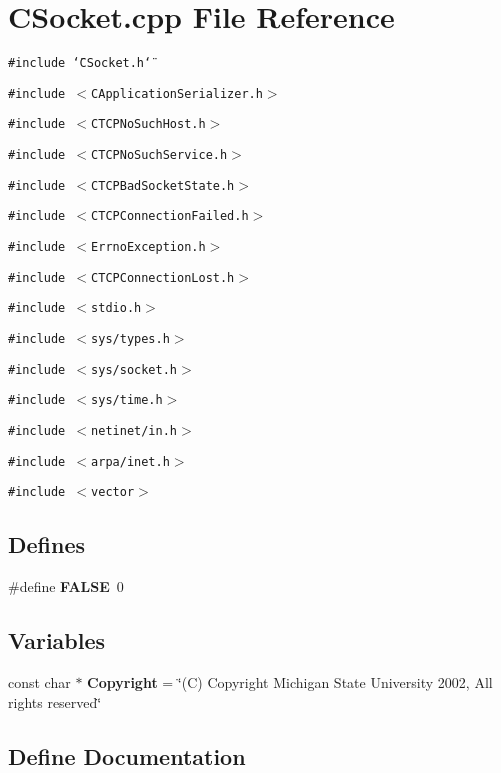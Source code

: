 \section{CSocket.cpp File Reference}
\label{CSocket_8cpp}
{\tt \#include \char`\"{}CSocket.h\char`\"{}}\par
{\tt \#include $<$CApplication\-Serializer.h$>$}\par
{\tt \#include $<$CTCPNo\-Such\-Host.h$>$}\par
{\tt \#include $<$CTCPNo\-Such\-Service.h$>$}\par
{\tt \#include $<$CTCPBad\-Socket\-State.h$>$}\par
{\tt \#include $<$CTCPConnection\-Failed.h$>$}\par
{\tt \#include $<$Errno\-Exception.h$>$}\par
{\tt \#include $<$CTCPConnection\-Lost.h$>$}\par
{\tt \#include $<$stdio.h$>$}\par
{\tt \#include $<$sys/types.h$>$}\par
{\tt \#include $<$sys/socket.h$>$}\par
{\tt \#include $<$sys/time.h$>$}\par
{\tt \#include $<$netinet/in.h$>$}\par
{\tt \#include $<$arpa/inet.h$>$}\par
{\tt \#include $<$vector$>$}\par
\subsection*{Defines}
\begin{CompactItemize}
\item 
\#define {\bf FALSE}\ 0
\end{CompactItemize}
\subsection*{Variables}
\begin{CompactItemize}
\item 
const char $\ast$ {\bf Copyright} = \char`\"{}(C) Copyright Michigan State University 2002, All rights reserved\char`\"{}
\end{CompactItemize}


\subsection{Define Documentation}
